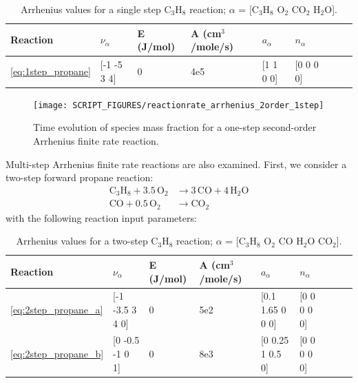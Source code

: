 \documentclass[11pt]{book}
\begin{document}
\begin{table}[ht]
\begin{center}
\caption[Arrhenius values for a single step C$_3$H$_8$ reaction]{Arrhenius values for a single step C$_3$H$_8$ reaction; $\alpha$ = [$\mathrm{C_3H_8}$ $\mathrm{O_2}$ $\mathrm{CO_2}$ $\mathrm{H_2O}$].}
\label{single_step_c3h8}
\begin{tabular}{|l|l|l|l|l|l|l|l|l|}
\hline Reaction & $\nu_{\alpha}$ & E (J/mol) & A (cm$^3$/mole/s) & $a_{\alpha}$ & $n_{\alpha}$  \\ \hline \hline
\ref{eq:1step_propane} & [-1 -5 3 4] & 0 & 4e5 & [1 1 0 0] & [0 0 0 0] \\ \hline
\end{tabular}
\end{center}
\end{table}
\begin{figure}[h!]
\centering
\texttt{[image: SCRIPT\_FIGURES/reactionrate\_arrhenius\_2order\_1step]}
\caption[Species evolution in a 2-order 1-step finite rate reaction]{Time evolution of species mass fraction for a one-step second-order Arrhenius finite rate reaction.}
\label{fig:Arrhenius_2Order_1step}
\end{figure}
Multi-step Arrhenius finite rate reactions are also examined. First, we consider a two-step forward propane reaction:
\begin{subequations}
\begin{align}
\label{eq:2step_propane_a}
\mathrm{C_3H_8+3.5 \, O_2} &\rightarrow  \mathrm{3 \, CO + 4 \, H_2O} \\
\label{eq:2step_propane_b}
\mathrm{CO+0.5 \, O_2} &\rightarrow \mathrm{CO_2}
\end{align}
\end{subequations}
with the following reaction input parameters:

\begin{table}[ht]
\begin{center}
\caption[Arrhenius values for a two-step C$_3$H$_8$ reaction]{Arrhenius values for a two-step C$_3$H$_8$ reaction; $\alpha$ = [$\mathrm{C_3H_8}$ $\mathrm{O_2}$ $\mathrm{CO}$ $\mathrm{H_2O}$ $\mathrm{CO_2}$].}
\label{two_step_c3h8}
\begin{tabular}{|l|l|l|l|l|l|l|l|l|}
\hline Reaction & $\nu_{\alpha}$ & E (J/mol) & A (cm$^3$/mole/s) & $a_{\alpha}$ & $n_{\alpha}$  \\ \hline \hline
\ref{eq:2step_propane_a} & [-1 -3.5 3 4 0] & 0 & 5e2 & [0.1 1.65 0 0 0] & [0 0 0 0 0] \\ \hline
\ref{eq:2step_propane_b} & [0 -0.5 -1 0 1] & 0 & 8e3 & [0 0.25 1 0.5 0] & [0 0 0 0 0] \\ \hline
\end{tabular}
\end{center}
\end{table}
\end{document}
